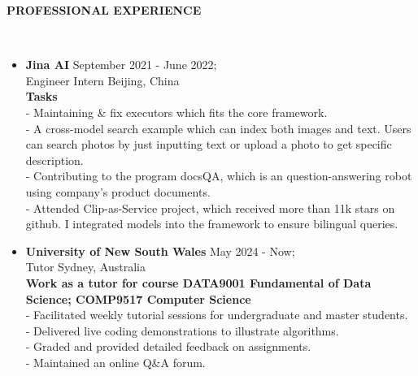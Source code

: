 \documentclass[10pt,article]{article}
\newcommand{\resheading}[1]{%
  {\small\colorbox{mygrey}{%
    \begin{minipage}{0.97\textwidth}\centering\textbf{#1 \vphantom{p\^{E}}}\end{minipage}%
  }}%
}
\begin{document}
\resheading{\textbf{PROFESSIONAL EXPERIENCE}}\\
\begin{itemize}
  \item \textbf{Jina AI} \hfill September 2021 - June 2022; \\
  Engineer Intern \hfill Beijing, China \\
  \textbf{Tasks} \\
  - Maintaining \& fix executors which fits the core framework. \\
 - A cross-model search example which can index both images and text. Users can search photos by just inputting text or upload a photo to get specific description. \\
 - Contributing to the program docsQA, which is an question-answering robot using company’s product documents. \\
 - Attended Clip-as-Service project, which received more than 11k stars on github. I integrated models into the framework to ensure bilingual queries. \\

 \item \textbf{University of New South Wales} \hfill May 2024 - Now; \\
  Tutor \hfill Sydney, Australia\\
  \textbf{Work as a tutor for course DATA9001 Fundamental of Data Science; COMP9517 Computer Science} \\
  - Facilitated weekly tutorial sessions for undergraduate and master students. \\
  - Delivered live coding demonstrations to illustrate algorithms. \\
  - Graded and provided detailed feedback on assignments. \\
  - Maintained an online Q\&A forum. \\
  
\end{itemize}
\end{document}
